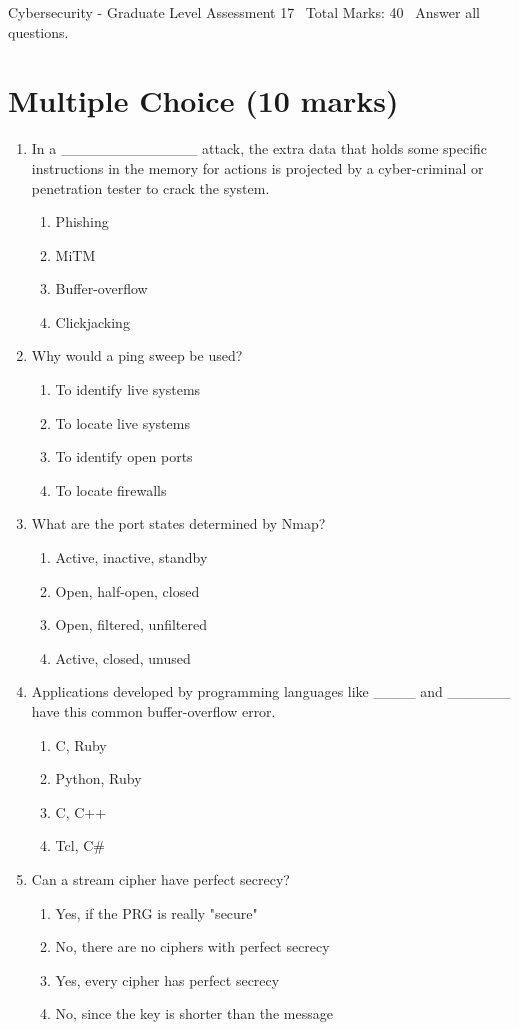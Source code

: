 \documentclass[12pt]{article}
\begin{document}
\begin{center}
Cybersecurity - Graduate Level Assessment 17 \
Total Marks: 40 \
Answer all questions.
\end{center}

\section*{Multiple Choice (10 marks)}
\begin{enumerate}[label=\arabic*.]
\item In a \_\_\_\_\_\_\_\_\_\_\_\_\_ attack, the extra data that holds some specific instructions in the memory for actions is projected by a cyber-criminal or penetration tester to crack the system.
\begin{enumerate}[label=(\alph*)]
    \item Phishing
    \item MiTM
    \item Buffer-overflow
    \item Clickjacking
\end{enumerate}
\item Why would a ping sweep be used?
\begin{enumerate}[label=(\alph*)]
    \item To identify live systems
    \item To locate live systems
    \item To identify open ports
    \item To locate firewalls
\end{enumerate}
\item What are the port states determined by Nmap?
\begin{enumerate}[label=(\alph*)]
    \item Active, inactive, standby
    \item Open, half-open, closed
    \item Open, filtered, unfiltered
    \item Active, closed, unused
\end{enumerate}
\item Applications developed by programming languages like \_\_\_\_ and \_\_\_\_\_\_ have this common buffer-overflow error.
\begin{enumerate}[label=(\alph*)]
    \item C, Ruby
    \item Python, Ruby
    \item C, C++
    \item Tcl, C\#
\end{enumerate}
\item Can a stream cipher have perfect secrecy?
\begin{enumerate}[label=(\alph*)]
    \item Yes, if the PRG is really "secure"
    \item No, there are no ciphers with perfect secrecy
    \item Yes, every cipher has perfect secrecy
    \item No, since the key is shorter than the message
\end{enumerate}
\end{enumerate}
\end{document}
